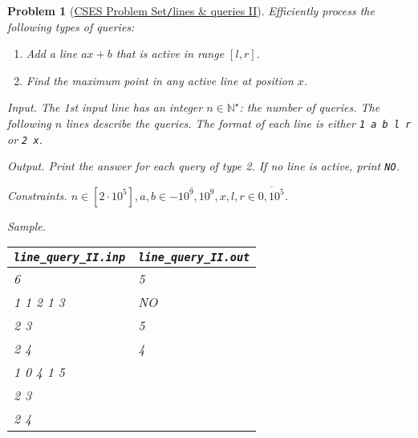 \documentclass{article}
\newtheorem{problem}{Problem}
\begin{document}
\begin{problem}[\href{https://cses.fi/problemset/task/3430}{CSES Problem Set{\tt/}lines \& queries II}]
    Efficiently process the following types of queries:
    \begin{enumerate}
        \item Add a line $ax + b$ that is active in range $[l,r]$.
        \item Find the maximum point in any active line at position $x$.
    \end{enumerate}
    \item {\sf Input.} The 1st input line has an integer $n\in\mathbb{N}^\star$: the number of queries. The following $n$ lines describe the queries. The format of each line is either {\tt1 a b l r} or {\tt2 x}.
    \item {\sf Output.} Print the answer for each query of type 2. If no line is active, print {\tt NO}.
    \item {\sf Constraints.} $n\in[2\cdot10^5],a,b\in\overline{-10^9,10^9},x,l,r\in\overline{0,10^5}$.
    \item {\sf Sample.}
    \begin{table}[H]
        \centering
        \begin{tabular}{|l|l|}
            \hline
            \verb|line_query_II.inp| & \verb|line_query_II.out| \\
            \hline
            6 & 5 \\
            1 1 2 1 3 & NO \\
            2 3 & 5 \\
            2 4 & 4 \\
            1 0 4 1 5 & \\
            2 3 & \\
            2 4 & \\
            \hline
        \end{tabular}
    \end{table}
\end{problem}
\end{document}
